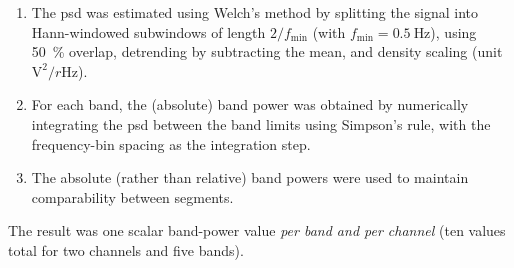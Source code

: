 \begin{enumerate}
    \item The \gls{psd} was estimated using Welch’s method by splitting the signal into Hann-windowed subwindows of length $2/f_{\min}$ (with $f_{\min}=\SI{0.5}{\Hz}$), using \SI{50}{\percent} overlap, detrending by subtracting the mean, and density scaling (unit $\si{\volt}^2 / r\si{\Hz}$).
    \item For each band, the (absolute) band power was obtained by numerically integrating the \gls{psd} between the band limits using Simpson’s rule, with the frequency-bin spacing as the integration step.
    \item The absolute (rather than relative) band powers were used to maintain comparability between segments.
\end{enumerate}

The result was one scalar band-power value \textit{per band and per channel} (ten values total for two channels and five bands).

